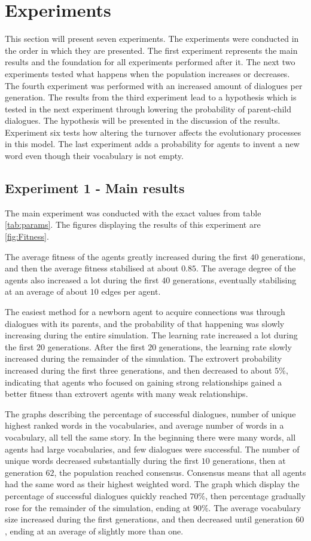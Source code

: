 \section{Experiments}
This section will present seven experiments. The experiments were conducted in the order in which they are presented. The first experiment represents the main results and the foundation for all experiments performed after it. The next two experiments tested what happens when the population increases or decreases. The fourth experiment was performed with an increased amount of dialogues per generation. The results from the third experiment lead to a hypothesis which is tested in the next experiment through lowering the probability of parent-child dialogues. The hypothesis will be presented in the discussion of the results. Experiment six tests how altering the turnover affects the evolutionary processes in this model. The last experiment adds a probability for agents to invent a new word even though their vocabulary is not empty.

\subsection{Experiment 1 - Main results}
The main experiment was conducted with the exact values from table \ref{tab:params}. The figures displaying the results of this experiment are \ref{fig:Fitness}. 

The average fitness of the agents greatly increased during the first $40$ generations, and then the average fitness stabilised at about $0.85$. The average degree of the agents also increased a lot during the first $40$ generations, eventually stabilising at an average of about $10$ edges per agent. 

The easiest method for a newborn agent to acquire connections was through dialogues with its parents, and the probability of that happening was slowly increasing during the entire simulation. The learning rate increased a lot during the first $20$ generations. After the first $20$ generations, the learning rate slowly increased during the remainder of the simulation. The extrovert probability increased during the first three generations, and then decreased to about $5\%$, indicating that agents who focused on gaining strong relationships gained a better fitness than extrovert agents with many weak relationships. 

The graphs describing the percentage of successful dialogues, number of unique highest ranked words in the vocabularies, and average number of words in a vocabulary, all tell the same story. In the beginning there were many words, all agents had large vocabularies, and few dialogues were successful. The number of unique words decreased substantially during the first $10$ generations, then at generation $62$, the population reached consensus. Consensus means that all agents had the same word as their highest weighted word. The graph which display the percentage of successful dialogues quickly reached $70\%$, then percentage gradually rose for the remainder of the simulation, ending at $90\%$. The average vocabulary size increased during the first generations, and then decreased until generation $60$, ending at an average of slightly more than one.

